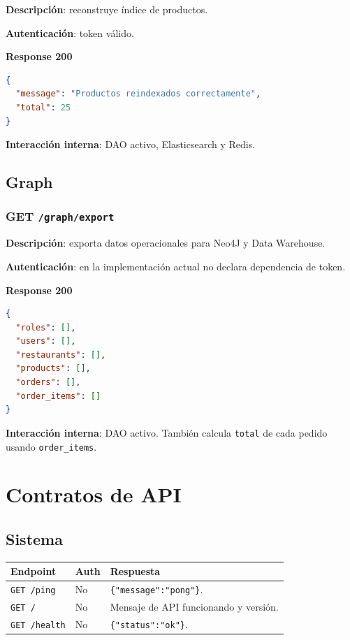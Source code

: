 \documentclass[12pt,letterpaper]{article}
\def\endpoint#1#2{\texttt{#1 #2}}
\def\codefile#1{\nolinkurl{#1}}
\def\methodget{\textbf{\color{blue!60!black}GET}}
\begin{document}
\textbf{Descripción}: reconstruye índice de productos.

\textbf{Autenticación}: token válido.

\textbf{Response 200}
\begin{lstlisting}[language=json]
{
  "message": "Productos reindexados correctamente",
  "total": 25
}
\end{lstlisting}

\textbf{Interacción interna}: DAO activo, Elasticsearch y Redis.

\subsection{Graph}

\subsubsection{\methodget{} \codefile{/graph/export}}

\textbf{Descripción}: exporta datos operacionales para Neo4J y Data Warehouse.

\textbf{Autenticación}: en la implementación actual no declara dependencia de token.

\textbf{Response 200}
\begin{lstlisting}[language=json]
{
  "roles": [],
  "users": [],
  "restaurants": [],
  "products": [],
  "orders": [],
  "order_items": []
}
\end{lstlisting}

\textbf{Interacción interna}: DAO activo. También calcula \codefile{total} de cada pedido usando \codefile{order\_items}.

\section{Contratos de API}

\subsection{Sistema}

\begin{longtable}{p{}p{}p{}}
\toprule
\textbf{Endpoint} & \textbf{Auth} & \textbf{Respuesta}\\
\midrule
\endpoint{GET}{/ping} & No & \codefile{\{"message":"pong"\}}.\\
\endpoint{GET}{/} & No & Mensaje de API funcionando y versión.\\
\endpoint{GET}{/health} & No & \codefile{\{"status":"ok"\}}.\\
\bottomrule
\end{longtable}
\end{document}
